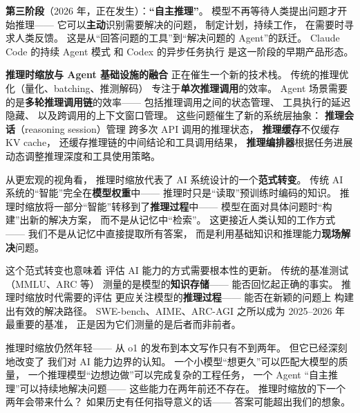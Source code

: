 \textbf{第三阶段}（2026 年，正在发生）：\textbf{“自主推理”}。
模型不再等待人类提出问题才开始推理——
它可以\textbf{主动}识别需要解决的问题，
制定计划，持续工作，
在需要时寻求人类反馈。
这是从“回答问题的工具”到“解决问题的 Agent”的跃迁。
Claude Code 的持续 Agent 模式
和 Codex 的异步任务执行
是这一阶段的早期产品形态。

\textbf{推理时缩放与 Agent 基础设施的融合}
正在催生一个新的技术栈。
传统的推理优化（量化、batching、推测解码）
专注于\textbf{单次推理调用}的效率。
Agent 场景需要的是\textbf{多轮推理调用链}的效率——
包括推理调用之间的状态管理、
工具执行的延迟隐藏、
以及跨调用的上下文窗口管理。
这些问题催生了新的系统层抽象：
\textbf{推理会话}（reasoning session）管理
跨多次 API 调用的推理状态，
\textbf{推理缓存}不仅缓存 KV cache，
还缓存推理链的中间结论和工具调用结果，
\textbf{推理编排器}根据任务进展
动态调整推理深度和工具使用策略。

从更宏观的视角看，
推理时缩放代表了 AI 系统设计的一个\textbf{范式转变}。
传统 AI 系统的“智能”完全在\textbf{模型权重}中——
推理时只是“读取”预训练时编码的知识。
推理时缩放将一部分“智能”转移到了\textbf{推理过程}中——
模型在面对具体问题时“构建”出新的解决方案，
而不是从记忆中“检索”。
这更接近人类认知的工作方式——
我们不是从记忆中直接提取所有答案，
而是利用基础知识和推理能力\textbf{现场解决}问题。

这个范式转变也意味着
评估 AI 能力的方式需要根本性的更新。
传统的基准测试（MMLU、ARC 等）
测量的是模型的\textbf{知识存储}——
能否回忆起正确的事实。
推理时缩放时代需要的评估
更应关注模型的\textbf{推理过程}——
能否在新颖的问题上
构建出有效的解决路径。
SWE-bench、AIME、ARC-AGI
之所以成为 2025--2026 年最重要的基准，
正是因为它们测量的是后者而非前者。

推理时缩放仍然年轻——
从 o1 的发布到本文写作只有不到两年。
但它已经深刻地改变了
我们对 AI 能力边界的认知。
一个小模型“想更久”可以匹配大模型的质量，
一个推理模型“边想边做”可以完成复杂的工程任务，
一个 Agent “自主推理”可以持续地解决问题——
这些能力在两年前还不存在。
推理时缩放的下一个两年会带来什么？
如果历史有任何指导意义的话——
答案可能超出我们的想象。


